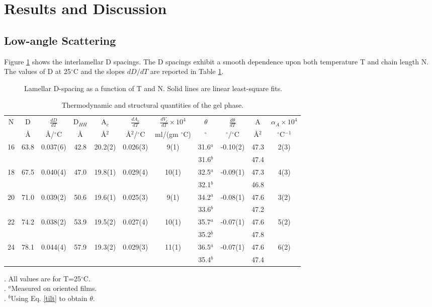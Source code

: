 \section{Results and Discussion}
 
\subsection{Low-angle Scattering}

Figure \ref{gel_d95} shows the interlamellar D spacings.  
The D spacings exhibit a smooth
dependence upon both temperature T and chain length N.  The
values of D at 25$^{\circ}$C and the slopes $dD/dT$ are reported in Table 
\ref{gel_table_master}.

\begin{figure}[h]
\centerline {}
\caption{Lamellar D-spacing as a function of T and N.
Solid lines are linear least-square fits. 
\label{gel_d95}}
\end{figure}

\begin{table}
\caption{Thermodynamic and structural quantities of the gel phase.
\label{gel_table_master}}
\begin{tabular}{ccccccccccc}
\\ \hline \hline
N & D & $\frac{dD}{dT}$ & D$_{HH}$ & A$_c$ & $\frac{dA_c}{dT}$ &
$\frac{dV_c}{dT} \times 10^4$ & $\theta$ & $\frac{d\theta}{dT}$ & 
A & $\alpha_A \times 10^4$ \\ 
 & \AA & \AA /$^\circ$C & \AA & \AA$^2$ & \AA$^2$/$^\circ$C & 
ml/(gm $^\circ$C) & $^\circ$ & 
$^\circ$/$^\circ$C & \AA$^2$ & $^\circ$C$^{-1}$ \\ \hline
16 & 63.8 & 0.037(6) & 42.8 & 20.2(2) & 0.026(3) 
& 9(1) & 31.6$^a$ & -0.10(2) & 47.3 & 2(3) \\
& & & & & & & 31.6$^b$ & & 47.4 & \\ \hline
18 & 67.5 & 0.040(4) & 47.0 & 19.8(1) & 0.029(4) 
& 10(1) & 32.5$^a$ & -0.09(1) & 47.3 & 4(3) \\
& & & & & & & 32.1$^b$ & & 46.8 & \\ \hline
20 & 71.0 & 0.039(2) & 50.6 & 19.6(1) & 0.025(3) 
& 9(1) & 34.2$^a$ & -0.08(1) & 47.6 & 3(2) \\
& & & & & & & 33.6$^b$ & & 47.2 & \\ \hline
22 & 74.2 & 0.038(2) & 53.9 & 19.5(2) & 0.027(4) 
& 10(1) & 35.7$^a$ & -0.07(1) & 47.6 & 5(2) \\
& & & & & & & 35.2$^b$ & & 47.8 & \\ \hline
24 & 78.1 & 0.044(4) & 57.9 & 19.3(2) & 0.029(3) 
& 11(1) & 36.5$^a$ & -0.07(1) & 47.6 & 6(2) \\ 
& & & & & & & 35.4$^b$ & & 47.4 & \\
\hline \hline
\end{tabular}
{\small
{}. All values are for T=25$^{\circ}$C.\\
. $^{a}$Measured on oriented films.\\
. $^{b}$Using Eq. \ref{tilt} to obtain $\theta$.
}
\end{table}


